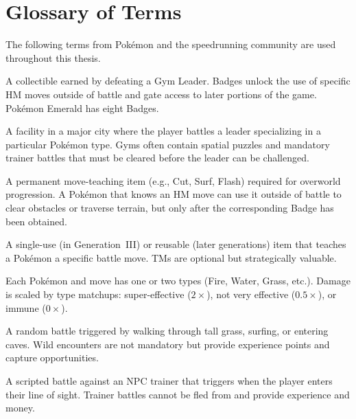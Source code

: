 
\appendix

\section{Glossary of Terms}\label{sec:appendix_glossary}

The following terms from Pok\'{e}mon and the speedrunning community are used throughout this thesis.

\begin{description}[style=nextline, leftmargin=2em]
\item[Badge] A collectible earned by defeating a Gym Leader. Badges unlock the use of specific HM moves outside of battle and gate access to later portions of the game. Pok\'{e}mon Emerald has eight Badges.
\item[Gym / Gym Leader] A facility in a major city where the player battles a leader specializing in a particular Pok\'{e}mon type. Gyms often contain spatial puzzles and mandatory trainer battles that must be cleared before the leader can be challenged.
\item[HM (Hidden Machine)] A permanent move-teaching item (e.g., Cut, Surf, Flash) required for overworld progression. A Pok\'{e}mon that knows an HM move can use it outside of battle to clear obstacles or traverse terrain, but only after the corresponding Badge has been obtained.
\item[TM (Technical Machine)] A single-use (in Generation~III) or reusable (later generations) item that teaches a Pok\'{e}mon a specific battle move. TMs are optional but strategically valuable.
\item[Type / Type Effectiveness] Each Pok\'{e}mon and move has one or two types (Fire, Water, Grass, etc.). Damage is scaled by type matchups: super-effective ($2\times$), not very effective ($0.5\times$), or immune ($0\times$).
\item[Wild Encounter] A random battle triggered by walking through tall grass, surfing, or entering caves. Wild encounters are not mandatory but provide experience points and capture opportunities.
\item[Trainer Battle] A scripted battle against an NPC trainer that triggers when the player enters their line of sight. Trainer battles cannot be fled from and provide experience and money.

\end{description}
